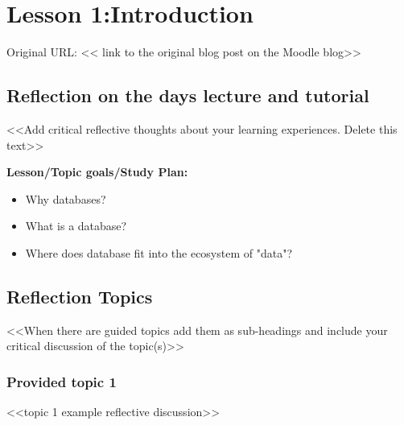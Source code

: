 
\section{Lesson 1:Introduction} %

Original URL: << link to the original blog post on the Moodle blog>> %



\subsection{Reflection on the days lecture and tutorial}

<<Add critical reflective thoughts about your learning experiences. Delete this text>>

{\bfseries{Lesson/Topic goals/Study Plan:}}
\begin{itemize}
    \item Why databases?
    \item What is a database?
    \item Where does database fit into the ecosystem of "data"?
\end{itemize}


\subsection{Reflection Topics}

<<When there are guided topics add them as sub-headings and include your critical discussion of the topic(s)>>

\blindtext[3]  %

\subsubsection{Provided topic 1}

<<topic 1 example reflective discussion>>

\blindtext[3] %

